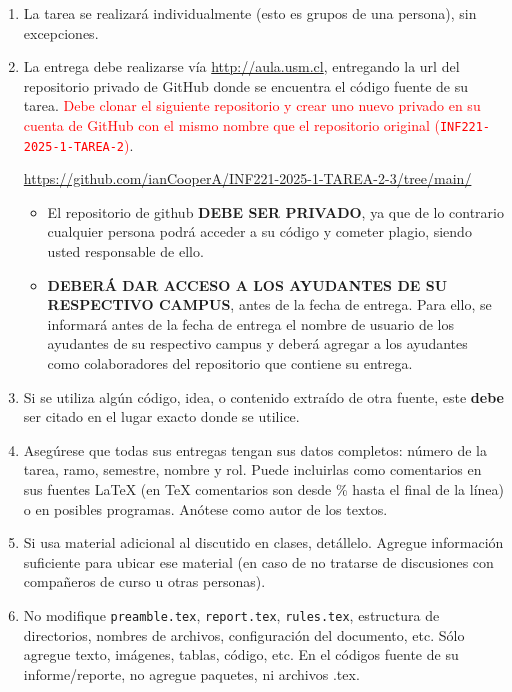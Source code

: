 
  \begin{enumerate}[(1)]
  \item
    La tarea se realizará individualmente
    (esto es grupos de una persona),
    sin excepciones.
  \item
    La entrega debe realizarse vía \url{http://aula.usm.cl}, entregando la url del repositorio privado de GitHub donde se encuentra el código fuente de su tarea. 
    \textcolor{red}{Debe clonar el siguiente repositorio y crear uno nuevo privado en su cuenta de GitHub con el mismo nombre que el repositorio original (\texttt{INF221-2025-1-TAREA-2})}.
    \begin{center}

      \url{https://github.com/ianCooperA/INF221-2025-1-TAREA-2-3/tree/main/}
          
  \end{center}

  \begin{itemize}
      
  \item El repositorio de github \textbf{DEBE SER PRIVADO}, ya que de lo contrario cualquier persona podrá acceder a su código y cometer plagio, siendo usted responsable de ello.
  \item  \textbf{DEBERÁ DAR ACCESO A LOS AYUDANTES DE SU RESPECTIVO CAMPUS}, antes de la fecha de entrega. Para ello, se informará antes de la fecha de entrega el nombre de usuario de los ayudantes de su respectivo campus y deberá agregar a los ayudantes como colaboradores del repositorio que contiene su entrega. 
  \end{itemize}

  \item Si se utiliza algún código, idea, o contenido extraído de otra fuente, este \textbf{debe} ser citado en el lugar exacto donde se utilice. 
  \item
  Asegúrese que todas sus entregas tengan sus datos completos:
  número de la tarea, ramo, semestre, nombre y rol.
  Puede incluirlas como comentarios en sus fuentes \LaTeX{}
  (en \TeX{} comentarios son desde \% hasta el final de la línea)
  o en posibles programas.
  Anótese como autor de los textos.

  \item
    Si usa material adicional al discutido en clases,
    detállelo.
    Agregue información suficiente para ubicar ese material
    (en caso de no tratarse de discusiones con compañeros de curso
     u otras personas).
    \item No modifique \texttt{preamble.tex}, \texttt{report.tex}, \texttt{rules.tex}, estructura de directorios, nombres de archivos, configuración del documento, etc. Sólo agregue texto, imágenes, tablas, código, etc. En el códigos fuente de su informe/reporte, no agregue paquetes, ni archivos .tex.


\end{enumerate}
